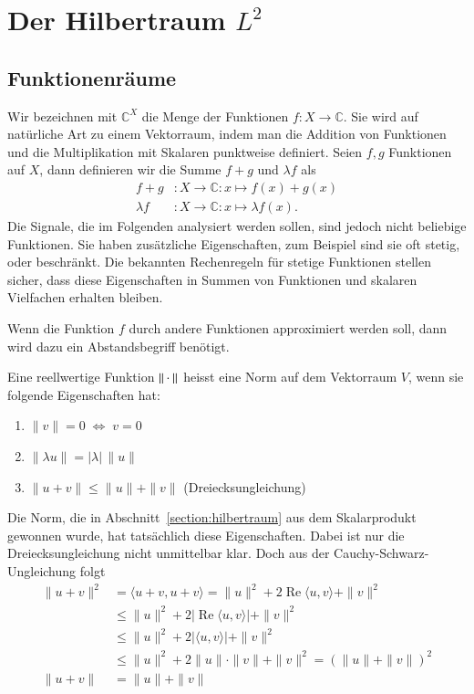 %
%
%
\section{Der Hilbertraum $L^2$
\label{section:l2}}

\subsection{Funktionenräume}
Wir bezeichnen mit $\mathbb C^X$ die Menge der Funktionen
$f\colon X\to \mathbb C$.
Sie wird auf natürliche Art zu einem Vektorraum, indem man die
Addition von Funktionen und die Multiplikation mit Skalaren
punktweise definiert.
Seien $f,g$ Funktionen auf $X$, dann definieren wir die Summe $f+g$ und
$\lambda f$ als
\begin{align*}
f+g&\colon X\to\mathbb C: x \mapsto f(x) + g(x)
\\
\lambda f &\colon X \to \mathbb C: x \mapsto \lambda f(x).
\end{align*}
Die Signale, die im Folgenden analysiert werden sollen, sind jedoch
nicht beliebige Funktionen.
Sie haben zusätzliche Eigenschaften, zum Beispiel sind sie oft stetig,
oder beschränkt.
Die bekannten Rechenregeln für stetige Funktionen stellen sicher, dass
diese Eigenschaften in Summen von Funktionen und skalaren Vielfachen
erhalten bleiben.

Wenn die Funktion $f$ durch andere Funktionen approximiert werden soll,
dann wird dazu ein Abstandsbegriff benötigt.

\begin{definition}
Eine reellwertige Funktion $\|\mathstrut\cdot\mathstrut\|$ heisst
eine Norm auf dem Vektorraum $V$, wenn sie folgende Eigenschaften hat:
\begin{enumerate}
\item $\|v\|=0\;\Leftrightarrow\; v = 0$
\item $\| \lambda u \| = |\lambda| \,\|u\|$
\item $\|u + v\| \le \|u\| + \|v\|$ (Dreiecksungleichung)
\end{enumerate}
\end{definition}

Die Norm, die in Abschnitt~\ref{section:hilbertraum} aus dem Skalarprodukt
gewonnen wurde, hat tatsächlich diese Eigenschaften.
Dabei ist nur die Dreiecksungleichung nicht unmittelbar klar.
Doch aus der Cauchy-Schwarz-Ungleichung folgt
\begin{align*}
\| u + v \|^2
&=
\langle u+v,u+v\rangle
=
\| u \|^2 + 2\operatorname{Re} \langle u,v\rangle + \| v\|^2
\\
&\le
\| u \|^2 + 2|\operatorname{Re} \langle u,v\rangle| + \| v\|^2
\\
&\le
\| u \|^2 + 2|\langle u,v\rangle| + \| v\|^2
\\
&\le
\| u \|^2 + 2\| u \| \cdot \|v\| + \| v\|^2
=
(\|u\| + \| v \|)^2
\\
\|u+v\|
&=
\|u\| + \|v\|
\end{align*}

